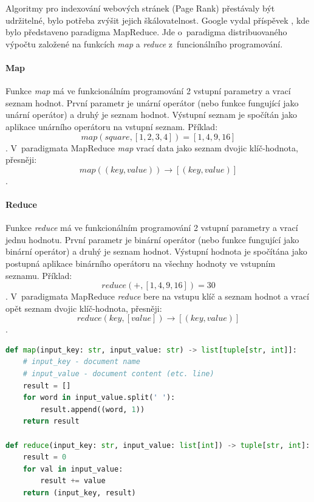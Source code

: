 Algoritmy pro indexování webových stránek (Page Rank) přestávaly být udržitelné, bylo potřeba zvýšit jejich škálovatelnost. Google vydal příspěvek , kde bylo představeno paradigma MapReduce. Jde o~paradigma distribuovaného výpočtu založené na funkcích \textit{map} a \textit{reduce} z~funcionálního programování.

\paragraph*{Map} Funkce \textit{map} má ve funkcionálním programování 2 vstupní parametry a vrací seznam hodnot. První parametr je unární operátor (nebo funkce fungující jako unární operátor) a druhý je seznam hodnot. Výstupní seznam je spočítán jako aplikace unárního operátoru na vstupní seznam. Příklad:
$$
map(square, [1, 2, 3, 4]) = [1, 4, 9, 16]
$$.
V~paradigmata MapReduce \textit{map} vrací data jako seznam dvojic klíč-hodnota, přesněji: $$
map((key, value)) \rightarrow [(key, value)]
$$.

\paragraph*{Reduce} Funkce \textit{reduce} má ve funkcionálním programování 2 vstupní parametry a vrací jednu hodnotu. První parametr je binární operátor (nebo funkce fungující jako binární operátor) a druhý je seznam hodnot. Výstupní hodnota je spočítána jako postupná aplikace binárního operátoru na všechny hodnoty ve vstupním seznamu. Příklad:
$$
reduce(+, [1, 4, 9, 16]) = 30
$$.
V~paradigmata MapReduce \textit{reduce} bere na vstupu klíč a seznam hodnot a vrací opět seznam dvojic klíč-hodnota, přesněji: $$
reduce(key, [value]) \rightarrow [(key, value)]
$$.

\bigskip\noindent\begin{minipage}{\linewidth}
\begin{lstlisting}[language=Python, caption={Příklad implementace funkcí \textit{map} a \textit{reduce} v~paradigmatu MapReduce pro počítání četnosti slov ve vstupu v~Pythonu.}]
def map(input_key: str, input_value: str) -> list[tuple[str, int]]:
    # input_key - document name
    # input_value - document content (etc. line)
    result = []
    for word in input_value.split(' '):
        result.append((word, 1))
    return result

def reduce(input_key: str, input_value: list[int]) -> tuple[str, int]:
    result = 0
    for val in input_value:
        result += value
    return (input_key, result)
\end{lstlisting}
\end{minipage}

